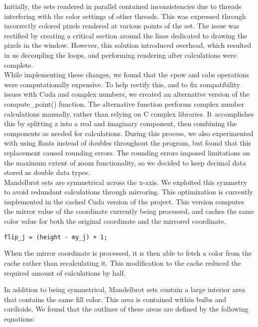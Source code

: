 \documentclass{article}
\begin{document}
Initially, the sets rendered in parallel contained inconsistencies due to threads interfering with the color settings of other threads. This was expressed through incorrectly colored pixels rendered at various points of the set. The issue was rectified by creating a critical section around the lines dedicated to drawing the pixels in the window. However, this solution introduced overhead, which resulted in us decoupling the loops, and performing rendering after calculations were complete. \\

While implementing these changes, we found that the cpow and cabs operations were computationally expensive. To help rectify this, and to fix compatibility issues with Cuda and complex numbers, we created an alternative version of the compute\_point() function. The alternative function performs complex number calculations manually, rather than relying on C complex libraries. It accomplishes this by splitting z into a real and imaginary component, then combining the components as needed for calculations. During this process, we also experimented with using floats instead of doubles throughout the program, but found that this replacement caused rounding errors. The rounding errors imposed limitations on the maximum extent of zoom functionality, so we decided to keep decimal data stored as double data types.\\

Mandelbrot sets are symmetrical across the x-axis. We exploited this symmetry to avoid redundant calculations through mirroring. This optimization is currently implemented in the cached Cuda version of the project. This version computes the mirror value of the coordinate currently being processed, and caches the same color value for both the original coordinate and the mirrored coordinate. \\

\begin{verbatim}
flip_j = (height - my_j) + 1;
\end{verbatim}

When the mirror coordinate is processed, it is then able to fetch a color from the cache rather than recalculating it. This modification to the cache reduced the required amount of calculations by half.

In addition to being symmetrical, Mandelbrot sets contain a large interior area that contains the same fill color. This area is contained within bulbs and cardioids. We found that the outlines of these areas are defined by the following equations:
\end{document}
